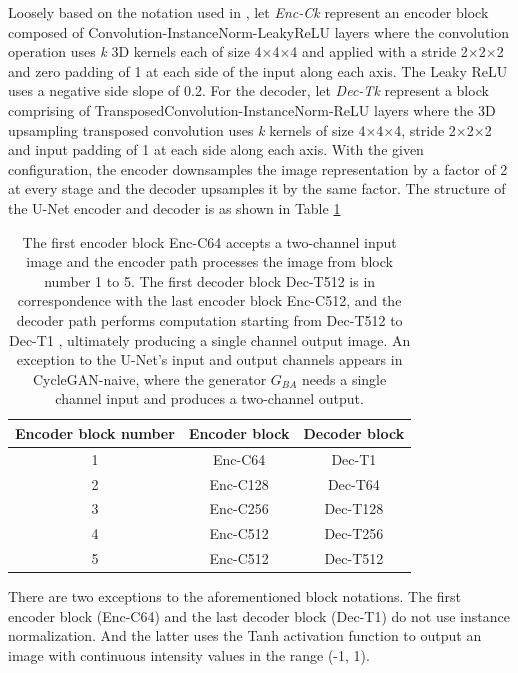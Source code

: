 Loosely based on the notation used in \cite{isola2017image}, let \textit{Enc-Ck} represent an encoder block composed of Convolution-InstanceNorm-LeakyReLU layers where the convolution operation uses \textit{k} 3D kernels each of size 4$\times$4$\times$4 and applied with a stride 2$\times$2$\times$2 and zero padding of 1 at each side of the input along each axis. The Leaky ReLU uses a negative side slope of 0.2. For the decoder, let \textit{Dec-Tk} represent a block comprising of TransposedConvolution-InstanceNorm-ReLU layers where the 3D upsampling transposed convolution uses \textit{k} kernels of size 4$\times$4$\times$4, stride 2$\times$2$\times$2 and input padding of 1 at each side along each axis. With the given configuration, the encoder downsamples the image representation by a factor of 2 at every stage and the decoder upsamples it by the same factor. 
The structure of the U-Net encoder and decoder is as shown in Table \ref{tab:generator_architecture}

\begin{table}[h!]
    \centering
    \begin{tabular}{|c|c|c|}
        \hline
        \textbf{Encoder block number} & \textbf{Encoder block} & \textbf{Decoder block} \\
        \hline
        1     & Enc-C64          & Dec-T1           \\
        \hline
        2     & Enc-C128         & Dec-T64          \\
        \hline
        3     & Enc-C256         & Dec-T128         \\
        \hline
        4     & Enc-C512         & Dec-T256         \\
        \hline
        5     & Enc-C512         & Dec-T512         \\
        \hline
    \end{tabular}
    \caption{The first encoder block Enc-C64 accepts a two-channel input image and the encoder path processes the image from block number 1 to 5. The first decoder block Dec-T512 is in correspondence with the last encoder block Enc-C512, and the decoder path performs computation starting from Dec-T512 to Dec-T1 , ultimately producing a single channel output image. An exception to the U-Net's input and output channels appears in CycleGAN-naive, where the generator $G_{BA}$ needs a single channel input and produces a two-channel output.}
    \label{tab:generator_architecture}
\end{table}

There are two exceptions to the aforementioned block notations. The first encoder block (Enc-C64) and the last decoder block (Dec-T1) do not use instance normalization. And the latter uses the Tanh activation function to output an image with continuous intensity values in the range (-1, 1). 


